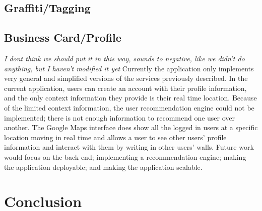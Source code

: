\documentclass[11pt]{article}
\begin{document}
\subsection{Graffiti/Tagging}
\subsection{Business Card/Profile}


{\color{red} 
{\it I dont think we should put it in this way, sounds to negative, like we didn't do anything, but I haven't modified it yet}
Currently the application only implements very general and simplified versions of the services previously described. In the current application, users can create an account with their profile information, and the only context information they provide is their real time location. Because of the limited context information, the user recommendation engine could not be implemented; there is not enough information to recommend one user over another. The Google Maps interface does show all the logged in users at a specific location moving in real time and allows a user to see other users' profile information and interact with them by writing in other users' walls. Future work would focus on the back end; implementing a recommendation engine;  making the application deployable; and making the application scalable.
}


 \section{Conclusion}
\end{document}
